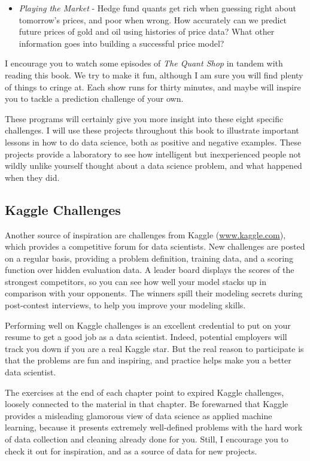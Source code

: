 \documentclass[10pt]{article}
\begin{document}
\begin{itemize}
    \item \textit{Playing the Market} - Hedge fund quants get rich when guessing right about tomorrow's prices, and poor when wrong. How accurately can we predict future prices of gold and oil using histories of price data? What other information goes into building a successful price model?
\end{itemize}

I encourage you to watch some episodes of \textit{The Quant Shop} in tandem with reading this book. We try to make it fun, although I am sure you will find plenty of things to cringe at. Each show runs for thirty minutes, and maybe will inspire you to tackle a prediction challenge of your own.

These programs will certainly give you more insight into these eight specific challenges. I will use these projects throughout this book to illustrate important lessons in how to do data science, both as positive and negative examples. These projects provide a laboratory to see how intelligent but inexperienced people not wildly unlike yourself thought about a data science problem, and what happened when they did.

\subsection{Kaggle Challenges}
Another source of inspiration are challenges from Kaggle (\href{http://www.kaggle.com}{www.kaggle.com}), which provides a competitive forum for data scientists. New challenges are posted on a regular basis, providing a problem definition, training data, and a scoring function over hidden evaluation data. A leader board displays the scores of the strongest competitors, so you can see how well your model stacks up in comparison with your opponents. The winners spill their modeling secrets during post-contest interviews, to help you improve your modeling skills.

Performing well on Kaggle challenges is an excellent credential to put on your resume to get a good job as a data scientist. Indeed, potential employers will track you down if you are a real Kaggle star. But the real reason to participate is that the problems are fun and inspiring, and practice helps make you a better data scientist.

The exercises at the end of each chapter point to expired Kaggle challenges, loosely connected to the material in that chapter. Be forewarned that Kaggle provides a misleading glamorous view of data science as applied machine learning, because it presents extremely well-defined problems with the hard work of data collection and cleaning already done for you. Still, I encourage you to check it out for inspiration, and as a source of data for new projects.
\end{document}
